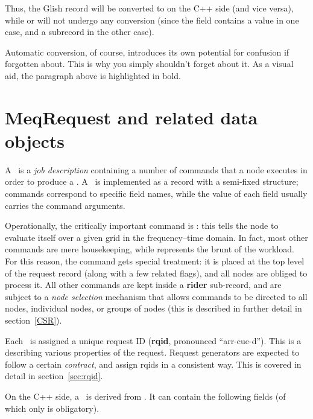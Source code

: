   Thus, the Glish record \qq{[foo=1,foo\_index=1,bar\_index=[2,3]]} will be
  converted to \qq{[Foo=1,Foo.Index=0,Bar.Index=[1,2]]} on the C++ side (and
  vice versa), while \qq{[foo\_index=1.0]} or \qq{[foo\_index=[a=1,b=2]]} will
  not undergo any conversion (since the  field contains a
   value in one case, and a subrecord in the other case).

  Automatic conversion, of course, introduces its own potential for confusion
  if forgotten about. This is why you simply shouldn't forget about it. As a
  visual aid, the paragraph above is highlighted in bold.

\section{MeqRequest and related data objects}

  A \Request\ is a {\em job description} containing a number of commands that a
  node executes in order to produce a \Result. A \Request\ is implemented as a
  record with a semi-fixed structure; commands correspond to specific field 
  names, while the value of each field usually carries the command arguments.
  
  Operationally, the critically important command is : this tells the
  node to evaluate itself over a given grid in the frequency--time domain. In
  fact, most other commands are mere housekeeping, while  represents
  the brunt of the workload. For this reason, the  command gets
  special treatment: it is placed at the top level of the request record (along
  with a few related flags), and all nodes are obliged to process it. All other
  commands are kept inside a {\bf rider} sub-record, and are subject to a {\em
  node selection} mechanism that allows commands to be directed to all nodes,
  individual nodes, or groups of nodes (this is described in further detail in
  section~\ref{CSR}).

  Each \Request\ is assigned a unique request ID ({\bf rqid}, pronounced
  ``arr-cue-d''). This is a  describing various properties of the
  request. Request generators are expected to follow a certain {\em contract},
  and assign rqids in a consistent way. This is covered in detail in
  section~\ref{sec:rqid}.

  On the C++ side, a \Request\ is derived from . It can contain
  the following fields (of which only  is obligatory).
  \vspace{1em}

